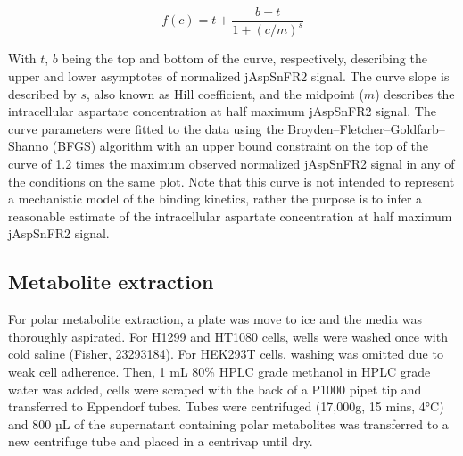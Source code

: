 \documentclass[9pt,lineno]{elife}
\begin{document}
$$
f(c) = t + \frac{b - t}{1 + (c/m)^s}
$$

With $t$, $b$ being the top and bottom of the curve, respectively, describing the upper and lower asymptotes of normalized jAspSnFR2 signal.
The curve slope is described by $s$, also known as Hill coefficient, and the midpoint ($m$) describes the intracellular aspartate concentration at half maximum jAspSnFR2 signal.
The curve parameters were fitted to the data using the Broyden–Fletcher–Goldfarb–Shanno (BFGS) algorithm with an upper bound constraint on the top of the curve of 1.2 times the maximum observed normalized jAspSnFR2 signal in any of the conditions on the same plot.
Note that this curve is not intended to represent a mechanistic model of the binding kinetics, rather the purpose is to infer a reasonable estimate of the intracellular aspartate concentration at half maximum jAspSnFR2 signal.

\subsection{Metabolite extraction}
For polar metabolite extraction, a plate was move to ice and the media was thoroughly aspirated.
For H1299 and HT1080 cells, wells were washed once with cold saline (Fisher, 23293184).
For HEK293T cells, washing was omitted due to weak cell adherence.
Then, 1 mL 80\% HPLC grade methanol in HPLC grade water was added, cells were scraped with the back of a P1000 pipet tip and transferred to Eppendorf tubes.
Tubes were centrifuged (17,000g, 15 mins, 4°C) and 800 µL of the supernatant containing polar metabolites was transferred to a new centrifuge tube and placed in a centrivap until dry.
\end{document}

